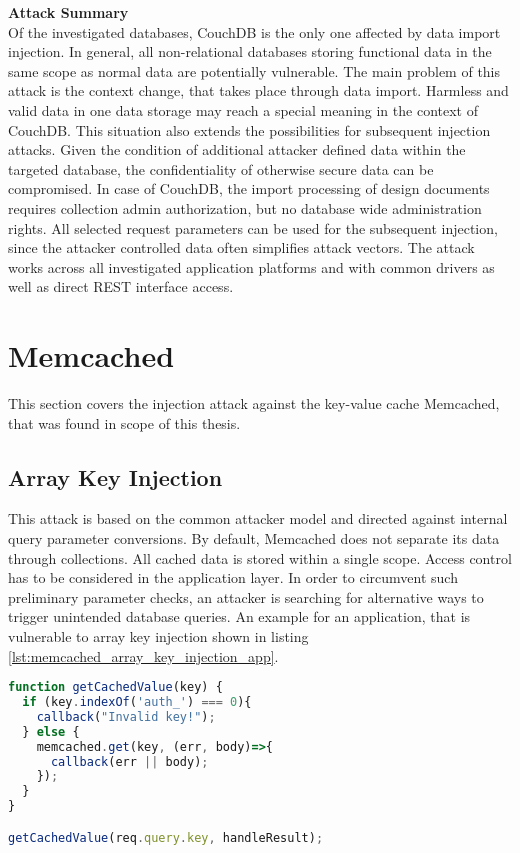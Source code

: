 \textbf{Attack Summary} \\
Of the investigated databases, CouchDB is the only one affected by data import injection. In general, all non-relational databases storing functional data in the same scope as normal data are potentially vulnerable. The main problem of this attack is the context change, that takes place through data import. Harmless and valid data in one data storage may reach a special meaning in the context of CouchDB. This situation also extends the possibilities for subsequent injection attacks. Given the condition of additional attacker defined data within the targeted database, the confidentiality of otherwise secure data can be compromised. In case of CouchDB, the import processing of design documents requires collection admin authorization, but no database wide administration rights. All selected request parameters can be used for the subsequent injection, since the attacker controlled data often simplifies attack vectors. The attack works across all investigated application platforms and with common drivers as well as direct REST interface access. 

\section{Memcached}
This section covers the injection attack against the key-value cache Memcached, that was found in scope of this thesis.
\subsection{Array Key Injection}
This attack is based on the common attacker model and directed against internal query parameter conversions. By default, Memcached does not separate its data through collections. All cached data is stored within a single scope. Access control has to be considered in the application layer. In order to circumvent such preliminary parameter checks, an attacker is searching for alternative ways to trigger unintended database queries. An example for an application, that is vulnerable to array key injection shown in listing \ref{lst:memcached_array_key_injection_app}.\\

\begin{lstlisting}[caption={Vulnerable NodeJS example for array key injection against Memcached}, label={lst:memcached_array_key_injection_app}, language=JavaScript]
function getCachedValue(key) {
  if (key.indexOf('auth_') === 0){
    callback("Invalid key!");
  } else {
    memcached.get(key, (err, body)=>{
      callback(err || body);
    });
  }
}

getCachedValue(req.query.key, handleResult);
\end{lstlisting}

